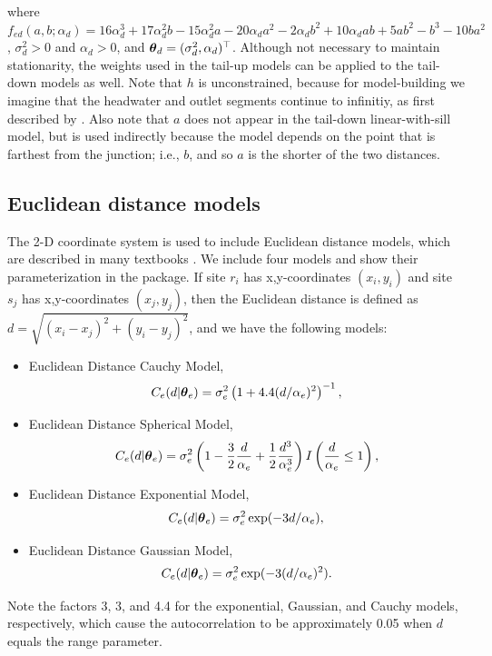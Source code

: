 \documentclass[nojss]{jss}
\def\btheta{\mbox{\boldmath $\theta$}}
\begin{document}
where $f_{ed}(a,b;\alpha_d)=16\alpha_d^3 + 17\alpha_d^2b - 15\alpha_d^2a - 20\alpha_da^2 - 2\alpha_db^2 + 10\alpha_dab + 5ab^2 - b^3 - 10ba^2$, $\sigma^2_d > 0$ and $\alpha_d > 0$, and $\btheta_d = (\sigma^2_d,\alpha_d)^\top$.  Although not necessary to maintain stationarity, the weights used in the tail-up models can be applied to the tail-down models as well.  Note that $h$ is unconstrained, because for model-building we imagine that the headwater and outlet segments continue to infinitiy, as first described by \citet{Ver:Pete:Theo:spat:2006}. Also note that $a$ does not appear in the tail-down linear-with-sill model, but is used indirectly because the model depends on the point that is farthest from the junction; i.e., $b$, and so $a$ is the shorter of the two distances.


\subsection{Euclidean distance models}\label{EucDist}

The 2-D coordinate system is used to include Euclidean distance
models, which are described in many textbooks
\citep*[e.g.,][]{Cres:stat:1993,Chil:Delf:geos:1999}.  We include four
models and show their parameterization in the  package.  If
site $r_i$ has x,y-coordinates $(x_i,y_i)$ and site $s_j$ has
x,y-coordinates $(x_j,y_j)$, then the Euclidean distance is defined as
$d=\sqrt{(x_i-x_j)^2+(y_i-y_j)^2}$, and we have the following models:

\begin{itemize}
\item Euclidean Distance Cauchy Model,
  \[
  C_e(d|\btheta_e)=
  \sigma^2_e\left(1 + 4.4(d/\alpha_e)^2\right)^{-1},
  \]
\item Euclidean Distance Spherical Model,
  \[
  C_e(d|\btheta_e)=
  \sigma^2_e\left(1-\frac{3}{2}\frac{d}{\alpha_e}+\frac{1}{2}\frac{d^3}{\alpha_e^3}
  \right)I\left(\frac{d}{\alpha_e}\leq 1\right),
  \]
\item Euclidean Distance Exponential Model,
  \[
  C_e(d|\btheta_e)=
  \sigma^2_e\exp(-3d/\alpha_e),
  \]
\item Euclidean Distance Gaussian Model,
  \[
  C_e(d|\btheta_e)=
  \sigma^2_e\exp(-3(d/\alpha_e)^2).
  \]
\end{itemize}
Note the factors 3, 3, and 4.4 for the exponential, Gaussian, and
Cauchy models, respectively, which cause the autocorrelation to be
approximately 0.05 when $d$ equals the range parameter.
\end{document}
